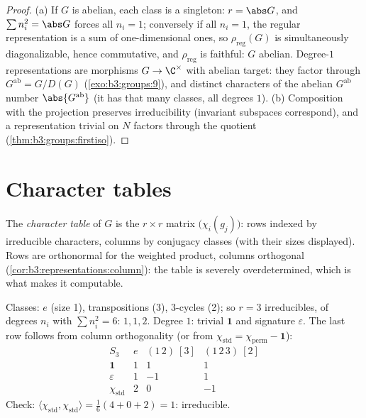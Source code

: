 \begin{proof}
(a) If $G$ is abelian, each class is a singleton: $r = \abs G$,
and $\sum n_i^2 = \abs G$ forces all $n_i = 1$; conversely if
all $n_i = 1$, the regular representation is a sum of
one-dimensional ones, so $\rho_{\mathrm{reg}}(G)$ is
simultaneously diagonalizable, hence commutative, and
$\rho_{\mathrm{reg}}$ is faithful: $G$ abelian. Degree-$1$
representations are morphisms $G \to \C^\times$ with abelian
target: they factor through $G^{\mathrm{ab}} = G/D(G)$
(\cref{exo:b3:groups:9}), and distinct characters of the abelian
$G^{\mathrm{ab}}$ number $\abs{G^{\mathrm{ab}}}$ (it has that
many classes, all degrees $1$). (b) Composition with the
projection preserves irreducibility (invariant subspaces
correspond), and a representation trivial on $N$ factors through
the quotient (\cref{thm:b3:groups:firstiso}).
\end{proof}

\section{Character tables}

\begin{definition}\label{def:b3:representations:table}
The \emph{character table} of $G$ is the
$r \times r$ matrix $\bigl(\chi_i(g_j)\bigr)$: rows indexed by
irreducible characters, columns by conjugacy classes (with their
sizes displayed). Rows are orthonormal for the weighted product,
columns orthogonal (\cref{cor:b3:representations:column}): the
table is severely overdetermined, which is what makes it
computable.
\end{definition}

\begin{example}\label{ex:b3:representations:s3}
Classes: $e$ (size 1), transpositions (3), $3$-cycles (2); so $r
= 3$ irreducibles, of degrees $n_i$ with $\sum n_i^2 = 6$: $1, 1,
2$. Degree $1$: trivial $\mathbf 1$ and signature $\varepsilon$.
The last row follows from column orthogonality (or from
$\chi_{\mathrm{std}} = \chi_{\mathrm{perm}} - \mathbf 1$):
\[
\begin{array}{c|ccc}
S_3 & e & (1\,2)\ [3] & (1\,2\,3)\ [2]\\
\hline
\mathbf 1 & 1 & 1 & 1\\
\varepsilon & 1 & -1 & 1\\
\chi_{\mathrm{std}} & 2 & 0 & -1
\end{array}
\]
Check: $\langle\chi_{\mathrm{std}},\chi_{\mathrm{std}}\rangle =
\frac{1}{6}(4 + 0 + 2) = 1$: irreducible.
\end{example}

